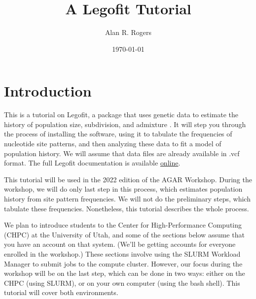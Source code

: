\documentclass[11pt]{article}
\begin{document}
\title{A Legofit Tutorial}
\author{Alan R. Rogers}
\date{\today}
\maketitle

\section{Introduction}
This is a tutorial on Legofit, a package that uses genetic data to
estimate the history of population size, subdivision, and admixture
\citep{Rogers:BMC-20-526, Rogers:PCJ-2-e32}. It will step you through
the process of installing the software, using it to tabulate the
frequencies of nucleotide site patterns, and then analyzing these data
to fit a model of population history. We will assume that data files
are already available in .vcf format. The full Legofit documentation
is available
\href{http://alanrogers.github.io/legofit/html/index.html}{online}.

This tutorial will be used in the 2022 edition of the AGAR
Workshop. During the workshop, we will do only last step in this
process, which estimates population history from site pattern
frequencies. We will not do the preliminary steps, which tabulate
these frequencies. Nonetheless, this tutorial describes the whole
process.

We plan to introduce students to the Center for High-Performance
Computing (CHPC) at the University of Utah, and some of the sections
below assume that you have an account on that system. (We'll be
getting accounts for everyone enrolled in the workshop.) These
sections involve using the SLURM Workload Manager to submit jobs to
the compute cluster. However, our focus during the workshop will be on
the last step, which can be done in two ways: either on the CHPC
(using SLURM), or on your own computer (using the bash shell). This
tutorial will cover both environments.
\end{document}
